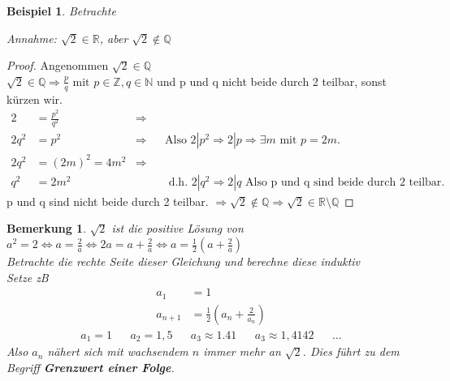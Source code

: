 \documentclass[a4paper,titlepage,oneside]{article}
\def\N{\ensuremath{\mathbb{N}} }
\def\Q{\ensuremath{\mathbb{Q}} }
\def\Z{\ensuremath{\mathbb{Z}} }
\def\R{\ensuremath{\mathbb{R}} }
\def\WSP{\text{Widerspruch! }}
\theoremstyle{thmstyle}
\newtheorem{bsp}[satz]{Beispiel}
\newtheorem{bem}[satz]{Bemerkung}
\begin{document}
\begin{bsp}
Betrachte
\begin{center}  \end{center}
Annahme: \( \sqrt{2} \in \R\), aber \(\sqrt{2} \not\in \Q\)
\end{bsp}
\begin{proof} Angenommen $\displaystyle \sqrt{2} \in \Q$ \\
$ \displaystyle \sqrt{2} \in \Q \Rightarrow \frac{p}{q} \text{ mit }p \in \Z, q \in \N $ und p und q nicht beide durch 2 teilbar, sonst kürzen wir.
\begin{align*}
2 &= \frac{p^2}{q^2} &\Rightarrow\\
2q^2 &= p^2 &\Rightarrow &&\text{Also } 2 | p^2 \Rightarrow 2 | p \Rightarrow \exists m \text{ mit } p = 2 m. \\
2q^2 &= (2m)^2 = 4m^2 &\Rightarrow \\
q^2 &= 2m^2 & &&\text{ d.h. } 2 | q^2 \Rightarrow 2 | q \text{ Also p und q sind beide durch 2 teilbar.}
\end{align*}
 \WSP p und q sind nicht beide durch 2 teilbar. $\displaystyle \Rightarrow \sqrt{2} \not\in \Q \Rightarrow \sqrt{2} \in \R\setminus\Q$
\end{proof}

\begin{bem}
\( \sqrt{2} \) ist die positive Lösung von $ \displaystyle a^2 = 2 \Leftrightarrow a = \frac{2}{a} \Leftrightarrow  2a = a + \frac{2}{a} \Leftrightarrow a= \frac{1}{2}\left(a + \frac{2}{a}\right)$ \\
Betrachte die rechte Seite dieser Gleichung und berechne diese induktiv\\
Setze zB
\begin{align*}
a_1 &= 1\\
a_{n+1} &= \frac{1}{2}\left(a_n + \frac{2}{a_n}\right)
\end{align*}
\begin{align*}
a_1 = 1 && a_2 = 1,5 && a_3 \approx 1.41 && a_3 \approx 1,4142 &&\dots
\end{align*}
Also \(a_n\) nähert sich mit wachsendem \(n\) immer mehr an \(\sqrt{2}\). Dies führt zu dem Begriff \textbf{Grenzwert einer Folge}.
\end{bem}
\end{document}

